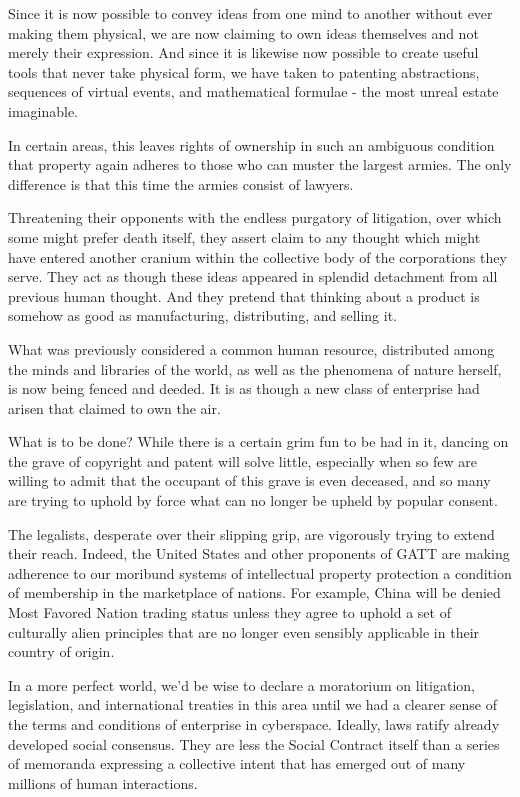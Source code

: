 \documentclass[
]{article}
\begin{document}
Since it is now possible to convey ideas from one mind to another
without ever making them physical, we are now claiming to own ideas
themselves and not merely their expression. And since it is likewise now
possible to create useful tools that never take physical form, we have
taken to patenting abstractions, sequences of virtual events, and
mathematical formulae - the most unreal estate imaginable.

In certain areas, this leaves rights of ownership in such an ambiguous
condition that property again adheres to those who can muster the
largest armies. The only difference is that this time the armies consist
of lawyers.

Threatening their opponents with the endless purgatory of litigation,
over which some might prefer death itself, they assert claim to any
thought which might have entered another cranium within the collective
body of the corporations they serve. They act as though these ideas
appeared in splendid detachment from all previous human thought. And
they pretend that thinking about a product is somehow as good as
manufacturing, distributing, and selling it.

What was previously considered a common human resource, distributed
among the minds and libraries of the world, as well as the phenomena of
nature herself, is now being fenced and deeded. It is as though a new
class of enterprise had arisen that claimed to own the air.

What is to be done? While there is a certain grim fun to be had in it,
dancing on the grave of copyright and patent will solve little,
especially when so few are willing to admit that the occupant of this
grave is even deceased, and so many are trying to uphold by force what
can no longer be upheld by popular consent.

The legalists, desperate over their slipping grip, are vigorously trying
to extend their reach. Indeed, the United States and other proponents of
GATT are making adherence to our moribund systems of intellectual
property protection a condition of membership in the marketplace of
nations. For example, China will be denied Most Favored Nation trading
status unless they agree to uphold a set of culturally alien principles
that are no longer even sensibly applicable in their country of origin.

In a more perfect world, we'd be wise to declare a moratorium on
litigation, legislation, and international treaties in this area until
we had a clearer sense of the terms and conditions of enterprise in
cyberspace. Ideally, laws ratify already developed social consensus.
They are less the Social Contract itself than a series of memoranda
expressing a collective intent that has emerged out of many millions of
human interactions.
\end{document}
